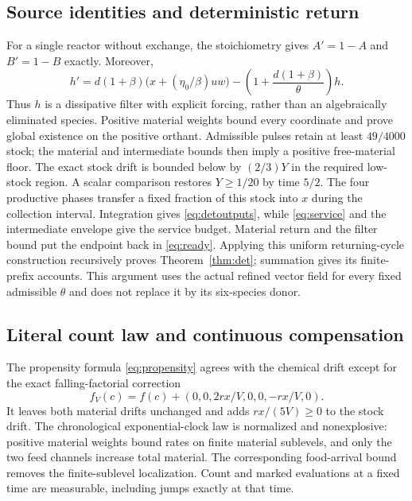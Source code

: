 \documentclass[11pt]{article}
\theoremstyle{definition}\newtheorem{definition}[theorem]{Definition}
\begin{document}
\subsection{Source identities and deterministic return}
For a single reactor without exchange, the stoichiometry gives $A'=1-A$ and $B'=1-B$ exactly.
Moreover,
\begin{equation}\label{eq:Dfilter}
h'=d(1+\beta)\bigl(x+(\eta_0/\beta)uw\bigr)
       -\left(1+\frac{d(1+\beta)}\theta\right)h.
\end{equation}
Thus $h$ is a dissipative filter with explicit forcing, rather than an algebraically
eliminated species. Positive material weights bound every coordinate and prove global
existence on the positive orthant. Admissible pulses retain at least $49/4000$ stock;
the material and intermediate bounds then imply a positive free-material floor.
The exact stock drift is bounded below by $(2/3)Y$ in the required low-stock region.
A scalar comparison restores $Y\ge1/20$ by time $5/2$.
The four productive phases transfer a fixed fraction of this stock into $x$ during the
collection interval. Integration gives \eqref{eq:detoutputs}, while \eqref{eq:service}
and the intermediate envelope give the service budget. Material return and the filter
bound put the endpoint back in \eqref{eq:ready}. Applying this uniform returning-cycle
construction recursively proves Theorem~\ref{thm:det}; summation gives its finite-prefix
accounts. This argument uses the actual refined vector field for every fixed admissible
$\theta$ and does not replace it by its six-species donor.

\subsection{Literal count law and continuous compensation}
The propensity formula \eqref{eq:propensity} agrees with the chemical drift except for
the exact falling-factorial correction
\begin{equation}
f_V(c)=f(c)+(0,0,2rx/V,0,0,-rx/V,0).
\end{equation}
It leaves both material drifts unchanged and adds $rx/(5V)\ge0$ to the stock drift.
The chronological exponential-clock law is normalized and nonexplosive: positive
material weights bound rates on finite material sublevels, and only the two feed
channels increase total material. The corresponding food-arrival bound removes the
finite-sublevel localization. Count and marked evaluations at a fixed time are measurable,
including jumps exactly at that time.
\end{document}
